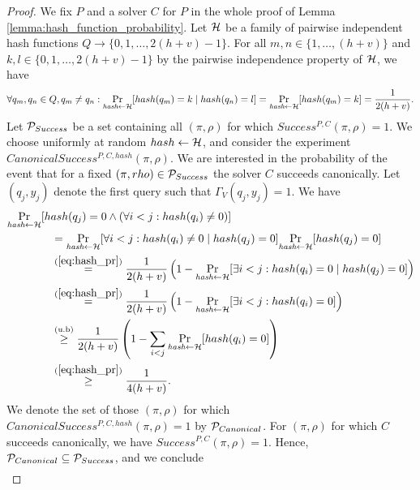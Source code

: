 \begin{proof}
We fix $P$ and a solver $C$ for $P$ in the whole proof of Lemma \ref{lemma:hash_function_probability}.
Let $\mathcal{H}$ be a family of pairwise independent hash functions $Q \rightarrow \{0,1, \dots,2(h+v)-1\}$.
For all $m,n \in \{1, \dots, (h+v)\}$ and $k,l \in \{0,1,\dots,2(h+v)-1\}$ by the pairwise independence property of $\mathcal{H}$, we have
\begin{align}
  \label{eq:hash_pr}
 \forall q_m,q_n \in Q, q_m \neq q_n : \underset{\textit{hash} \leftarrow \mathcal{H}}{\Pr}[hash(q_m) = k \mid hash(q_n) = l] =
 \underset{\textit{hash} \leftarrow \mathcal{H}}{\Pr}[hash(q_m) = k] = \frac{1}{2(h+v)}.
\end{align}
%
Let $\mathcal{P}_{Success}$ be a set containing all $(\pi,\rho)$ for which $Success^{P, C}(\pi, \rho) = 1$.
We choose uniformly at random $hash \leftarrow \mathcal{H}$, and consider the experiment $CanonicalSuccess^{P, C, hash}(\pi, \rho)$.
We are interested in the probability of the event that for a fixed $(\pi, rho) \in \mathcal{P}_{Success}$ the solver $C$ succeeds canonically.
Let $(q_j, y_j)$ denote the first query such that $\Gamma_V(q_j, y_j) = 1$.
We have
\begin{align*}
  &\underset{\textit{hash} \leftarrow \mathcal{H}}{\Pr}[hash(q_j) = 0 \land (\forall i < j : hash(q_i) \neq 0)]\\
  &\mbox\qquad\qquad = \underset{\textit{hash} \leftarrow \mathcal{H}}{\Pr}[\forall i < j : hash(q_i) \neq 0 \mid hash(q_j) = 0] \underset{\textit{hash} \leftarrow \mathcal{H}}{\Pr}[hash(q_j) = 0] \\
  &\mbox\qquad\qquad \stackrel{(\ref{eq:hash_pr})}{=} \frac{1}{2(h+v)}\left(1 -\underset{\textit{hash} \leftarrow \mathcal{H}}{\Pr}[\exists i < j : hash(q_i) = 0 \mid hash(q_j) = 0] \right) \\
  &\mbox\qquad\qquad \stackrel{(\ref{eq:hash_pr})}{=} \frac{1}{2(h+v)} \left( 1 -\underset{\textit{hash} \leftarrow \mathcal{H}}{\Pr}[\exists i < j : hash(q_i) = 0] \right) \\
  &\mbox\qquad\qquad \stackrel{(\text{u.b})}{\geq} \frac{1}{2(h+v)} \left( 1 - \sum_{i < j} \underset{\textit{hash} \leftarrow \mathcal{H}}{\Pr}[hash(q_i) = 0] \right) \\
  &\mbox\qquad\qquad \stackrel{(\ref{eq:hash_pr})}{\geq} \frac{1}{4(h+v)}.
\end{align*}
%
We denote the set of those $(\pi,\rho)$ for which $CanonicalSuccess^{P, C, hash}(\pi, \rho) = 1$ by $\mathcal{P}_{Canonical}$.
For $(\pi, \rho)$ for which $C$ succeeds canonically, we have $Success^{P, C}(\pi, \rho) = 1$.
Hence, $\mathcal{P}_{Canonical} \subseteq \mathcal{P}_{Success}$, and we conclude
\begin{align}

\end{align}
\end{proof}
